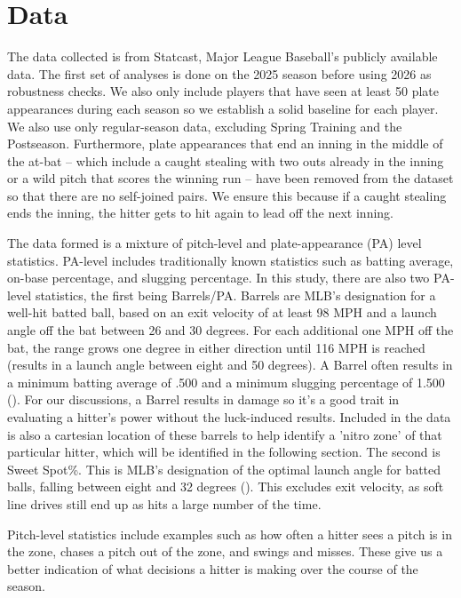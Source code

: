 \documentclass{article}
\begin{document}
\section{Data}

The data collected is from Statcast, Major League Baseball's publicly available data. The first set of analyses is done on the 2025 season before using 2026 as robustness checks. We also only include players that have seen at least 50 plate appearances during each season so we establish a solid baseline for each player. We also use only regular-season data, excluding Spring Training and the Postseason. Furthermore, plate appearances that end an inning in the middle of the at-bat -- which include a caught stealing with two outs already in the inning or a wild pitch that scores the winning run -- have been removed from the dataset so that there are no self-joined pairs. We ensure this because if a caught stealing ends the inning, the hitter gets to hit again to lead off the next inning.

The data formed is a mixture of pitch-level and plate-appearance (PA) level statistics. PA-level includes traditionally known statistics such as batting average, on-base percentage, and slugging percentage. In this study, there are also two PA-level statistics, the first being Barrels/PA. Barrels are MLB's designation for a well-hit batted ball, based on an exit velocity of at least 98 MPH and a launch angle off the bat between 26 and 30 degrees. For each additional one MPH off the bat, the range grows one degree in either direction until 116 MPH is reached (results in a launch angle between eight and 50 degrees). A Barrel often results in a minimum batting average of .500 and a minimum slugging percentage of 1.500 (\cite{mlb_barrel}). For our discussions, a Barrel results in damage so it's a good trait in evaluating a hitter's power without the luck-induced results. Included in the data is also a cartesian location of these barrels to help identify a 'nitro zone' of that particular hitter, which will be identified in the following section. The second is Sweet Spot\%. This is MLB's designation of the optimal launch angle for batted balls, falling between eight and 32 degrees (\cite{mlb_sweetspot}). This excludes exit velocity, as soft line drives still end up as hits a large number of the time.

Pitch-level statistics include examples such as how often a hitter sees a pitch is in the zone, chases a pitch out of the zone, and swings and misses. These give us a better indication of what decisions a hitter is making over the course of the season.
\end{document}
